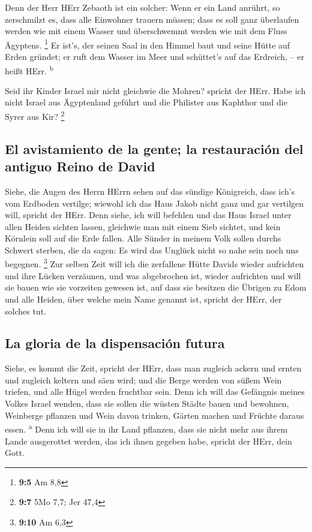  Denn der Herr HErr Zebaoth ist ein solcher: Wenn er ein
Land anrührt, so zerschmilzt es, dass alle Einwohner trauern müssen;
dass es soll ganz überlaufen werden wie mit einem Wasser und
überschwemmt werden wie mit dem Fluss Ägyptens. \footnote{\textbf{9:5}
  Am 8,8}  Er ist's, der seinen Saal in den Himmel baut
und seine Hütte auf Erden gründet; er ruft dem Wasser im Meer und
schüttet's auf das Erdreich, -- er heißt HErr. \textsuperscript{b}

 Seid ihr Kinder Israel mir nicht gleichwie die Mohren?
spricht der HErr. Habe ich nicht Israel aus Ägyptenland geführt und die
Philister aus Kaphthor und die Syrer aus Kir? \footnote{\textbf{9:7} 5Mo
  7,7; Jer 47,4}

\hypertarget{el-avistamiento-de-la-gente-la-restauraciuxf3n-del-antiguo-reino-de-david}{%
\subsection{El avistamiento de la gente; la restauración del antiguo
Reino de
David}\label{el-avistamiento-de-la-gente-la-restauraciuxf3n-del-antiguo-reino-de-david}}

 Siehe, die Augen des Herrn HErrn sehen auf das sündige
Königreich, dass ich's vom Erdboden vertilge; wiewohl ich das Haus Jakob
nicht ganz und gar vertilgen will, spricht der HErr.  Denn
siehe, ich will befehlen und das Haus Israel unter allen Heiden sichten
lassen, gleichwie man mit einem Sieb sichtet, und kein Körnlein soll auf
die Erde fallen.  Alle Sünder in meinem Volk sollen
durchs Schwert sterben, die da sagen: Es wird das Unglück nicht so nahe
sein noch uns begegnen. \footnote{\textbf{9:10} Am 6,3} 
Zur selben Zeit will ich die zerfallene Hütte Davids wieder aufrichten
und ihre Lücken verzäunen, und was abgebrochen ist, wieder aufrichten
und will sie bauen wie sie vorzeiten gewesen ist,  auf
dass sie besitzen die Übrigen zu Edom und alle Heiden, über welche mein
Name genannt ist, spricht der HErr, der solches tut.

\hypertarget{la-gloria-de-la-dispensaciuxf3n-futura}{%
\subsection{La gloria de la dispensación
futura}\label{la-gloria-de-la-dispensaciuxf3n-futura}}

 Siehe, es kommt die Zeit, spricht der HErr, dass man
zugleich ackern und ernten und zugleich keltern und säen wird; und die
Berge werden von süßem Wein triefen, und alle Hügel werden fruchtbar
sein.  Denn ich will das Gefängnis meines Volkes Israel
wenden, dass sie sollen die wüsten Städte bauen und bewohnen, Weinberge
pflanzen und Wein davon trinken, Gärten machen und Früchte daraus essen.
\textsuperscript{a}  Denn ich will sie in ihr Land
pflanzen, dass sie nicht mehr aus ihrem Lande ausgerottet werden, das
ich ihnen gegeben habe, spricht der HErr, dein Gott.
